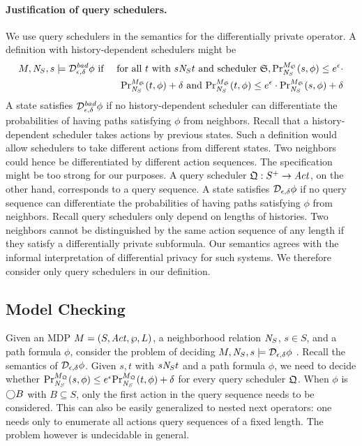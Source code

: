 \noindent
\paragraph{Justification of query schedulers.}
We use query schedulers in the semantics for the differentially
private operator. A definition with history-dependent schedulers
might be
\begin{eqnarray*}
  M, \neighbor{S}, s \models \dpriv{\epsilon}{\delta}^{\mathit{bad}} \phi
  & \textmd{ if } &
  \textmd{for all } t \textmd{ with } s \neighbor{S} t \textmd{ and
  scheduler } \scheduler{S},
  \myPr{s}{M_{\scheduler{S}}}{\neighbor{S}}{\phi} \leq
  e^{\epsilon} \cdot\\
  && \myPr{t}{M_{\scheduler{S}}}{\neighbor{S}}{\phi} + \delta \textmd{ and }
  \myPr{t}{M_{\scheduler{S}}}{\neighbor{S}}{\phi} \leq
  e^{\epsilon} \cdot \myPr{s}{M_{\scheduler{S}}}{\neighbor{S}}{\phi}
  + \delta
\end{eqnarray*}
A state satisfies $\dpriv{\epsilon}{\delta}^{\mathit{bad}} \phi$ if
no history-dependent scheduler can differentiate the probabilities
of having paths satisfying
$\phi$ from neighbors. Recall that a history-dependent scheduler takes
actions by previous states. Such a definition would allow
schedulers to take different actions from different states. 
Two neighbors could hence be differentiated by different action sequences.
The specification might be too strong for our purposes.
A query scheduler $\scheduler{Q} : S^+ \rightarrow \Act$,
on the other hand, corresponds to a query sequence. A state satisfies
$\dpriv{\epsilon}{\delta} \phi$ if no query sequence can differentiate
the probabilities of having paths satisfying $\phi$ from neighbors.
Recall query schedulers only depend on lengths of histories. Two
neighbors cannot be distinguished by the same action sequence of any
length if they satisfy a differentially private subformula.
Our semantics agrees with the informal interpretation of differential
privacy for such systems. We therefore consider only query schedulers
in our definition.

\subsection{Model Checking}
Given an MDP $M =
(S, \Act, \wp, L)$, a neighborhood relation $\neighbor{S}$, $s \in
S$, and a path formula $\phi$, consider the problem of deciding $M,
\neighbor{S}, s \models 
\dpriv{\epsilon}{\delta} \phi$ . Recall the semantics of $\dpriv{\epsilon}{\delta}
\phi$. Given $s, t$ with $s \neighbor{S} t$ and a path formula
$\phi$, we need to decide whether
$\myPr{s}{M_{\scheduler{Q}}}{\neighbor{S}}{\phi} \leq
e^{\epsilon} \myPr{t}{M_{\scheduler{Q}}}{\neighbor{S}}{\phi} + \delta$
for every query scheduler $\scheduler{Q}$.
When $\phi$ is $\gX B$ with $B\subseteq S$, only the first action in
the query sequence needs to be considered. This can also be easily generalized to nested next operators:  one needs only to enumerate
all actions query sequences of a fixed length.
The problem however is undecidable in general.

